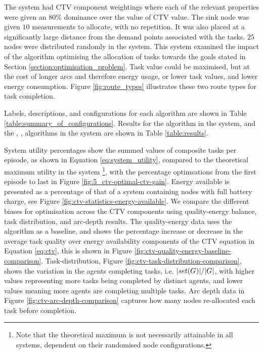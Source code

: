The \simulationExtended{}{} system had CTV component weightings where each of the relevant properties were given an $80\%$ dominance over the value of CTV value. The sink node was given $10$ measurements to allocate, with no repetition. It was also placed at a significantly large distance from the demand points associated with the tasks. $25$ nodes were distributed randomly in the system. This system examined the impact of the algorithm optimising the allocation of tasks towards the goals stated in Section \ref{section:optimisation_problem}. Task value could be maximised, but at the cost of longer arcs and therefore energy usage, or lower task values, and lower energy consumption. Figure \ref{fig:route_types} illustrates these two route types for task completion.

Labels, descriptions, and configurations for each algorithm are shown in Table \ref{table:summary_of_configurations}. Results for the \algorithmBalanced{}{} algorithm in the \simulationSimple{}{} system, and the \algorithmEnergy{}{}, \algorithmQuality{}{}, \algorithmDistribution{}{} algorithms in the \simulationExtended{}{} system are shown in Table \ref{table:results}.

System utility percentages show the summed values of composite tasks per episode, as shown in Equation \ref{eq:system_utility}, compared to the theoretical maximum utility in the system \footnote{Note that the theoretical maximum is not necessarily attainable in all systems, dependent on their randomised node configurations.}, with the percentage optimsations from the first episode to last in Figure \ref{fig:5_ctv-optimal-ctv-gain}. Energy available is presented as a percentage of that of a system containing nodes with full battery charge, see Figure \ref{fig:ctv-statistics-energy-available}. We compare the different biases for optimisation across the CTV components using quality-energy balance, task distribution, and arc-depth results. The quality-energy data uses the \algorithmEnergy{}{} algorithm as a baseline, and shows the percentage increase or decrease in the average task quality over energy availability components of the CTV equation in Equation \ref{eq:ctv}, this is shown in Figure \ref{fig:ctv-quality-energy-baseline-comparison}. Task-distribution, Figure \ref{fig:ctv-task-distribution-comparison},  shows the variation in the agents completing tasks, i.e. $\lvert set(G_{}^{}) \rvert{}/\lvert G_{}^{} \rvert{}$, with higher values representing more tasks being completed by distinct agents, and lower values meaning more agents are completing multiple tasks. Arc depth data in Figure \ref{fig:ctv-arc-depth-comparison} captures how many nodes re-allocated each task before completion.